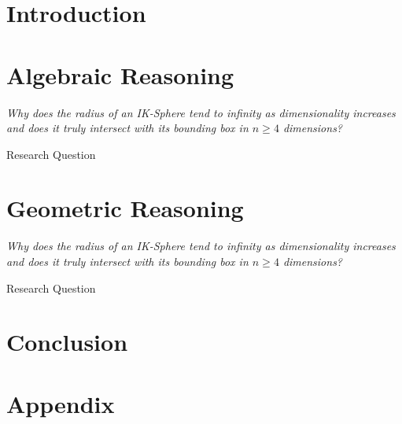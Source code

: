 \documentclass[a4paper, 12pt]{report}
\theoremstyle{definition}
\begin{document}
    
    
    \singlespacing
    
    \doublespacing
    
    
    \chapter{Introduction}
    
    
    \chapter{Algebraic Reasoning}
    \epigraph{\textit{Why  does  the  radius  of  an  IK-Sphere  tend  to  infinity  as  dimensionality increases and does it truly intersect with its bounding box in $n \geq 4$ dimensions?}}{Research Question}
    
    
    \chapter{Geometric Reasoning}
    \epigraph{\textit{Why  does  the  radius  of  an  IK-Sphere  tend  to  infinity  as  dimensionality increases and does it truly intersect with its bounding box in $n \geq 4$ dimensions?}}{Research Question}
    
    
    \chapter{Conclusion}
    
    
    \printbibliography
    
    \appendix
    \chapter{Appendix}
    
\end{document}
